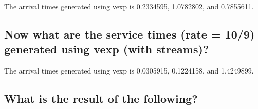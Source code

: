 \documentclass[
]{article}
\begin{document}
The arrival times generated using vexp is 0.2334595, 1.0782802, and
0.7855611.

\hypertarget{now-what-are-the-service-times-rate-109-generated-using-vexp-with-streams}{%
\subsection{Now what are the service times (rate = 10/9) generated using
vexp (with
streams)?}\label{now-what-are-the-service-times-rate-109-generated-using-vexp-with-streams}}

The arrival times generated using vexp is 0.0305915, 0.1224158, and
1.4249899.

\hypertarget{what-is-the-result-of-the-following}{%
\subsection{What is the result of the
following?}\label{what-is-the-result-of-the-following}}
\end{document}
